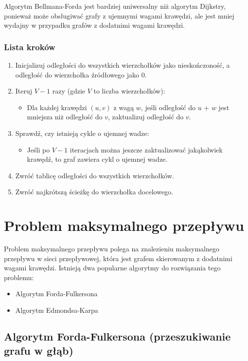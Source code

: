 \documentclass{article}
\begin{document}
Algorytm Bellmana-Forda jest bardziej uniwersalny niż algorytm Dijkstry, ponieważ może obsługiwać grafy z ujemnymi wagami krawędzi, ale jest mniej wydajny w przypadku grafów z dodatnimi wagami krawędzi.
\subsubsection{Lista kroków}
\begin{enumerate}
    \item Inicjalizuj odległości do wszystkich wierzchołków jako nieskończoność, a odległość do wierzchołka źródłowego jako 0.
    \item Iteruj $V-1$ razy (gdzie $V$ to liczba wierzchołków):
    \begin{itemize}
        \item Dla każdej krawędzi $(u, v)$ z wagą $w$, jeśli odległość do $u$ + $w$ jest mniejsza niż odległość do $v$, zaktualizuj odległość do $v$.
    \end{itemize}
    \item Sprawdź, czy istnieją cykle o ujemnej wadze:
    \begin{itemize}
        \item Jeśli po $V-1$ iteracjach można jeszcze zaktualizować jakąkolwiek krawędź, to graf zawiera cykl o ujemnej wadze.
    \end{itemize}
    \item Zwróć tablicę odległości do wszystkich wierzchołków.
    \item Zwróć najkrótszą ścieżkę do wierzchołka docelowego.
\end{enumerate}

\section{Problem maksymalnego przepływu}

Problem maksymalnego przepływu polega na znalezieniu maksymalnego przepływu w sieci przepływowej, która jest grafem skierowanym z dodatnimi wagami krawędzi.
Istnieją dwa popularne algorytmy do rozwiązania tego problemu:

\begin{itemize}
    \item Algorytm Forda-Fulkersona
    \item Algorytm Edmondsa-Karpa
\end{itemize}

\subsection{Algorytm Forda-Fulkersona (przeszukiwanie grafu w głąb)}
\end{document}

